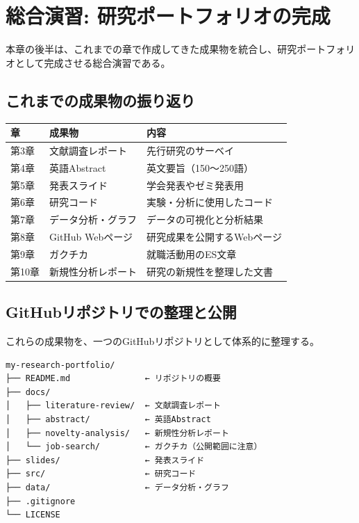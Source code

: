 \section{総合演習: 研究ポートフォリオの完成}

本章の後半は、これまでの章で作成してきた成果物を統合し、研究ポートフォリオとして完成させる総合演習である。

\subsection*{これまでの成果物の振り返り}

\begin{table}[H]
\centering
\small
\begin{tabular}{lll}
\toprule
章 & 成果物 & 内容 \\
\midrule
第3章 & 文献調査レポート & 先行研究のサーベイ \\
第4章 & 英語Abstract & 英文要旨（150〜250語） \\
第5章 & 発表スライド & 学会発表やゼミ発表用 \\
第6章 & 研究コード & 実験・分析に使用したコード \\
第7章 & データ分析・グラフ & データの可視化と分析結果 \\
第8章 & GitHub Webページ & 研究成果を公開するWebページ \\
第9章 & ガクチカ & 就職活動用のES文章 \\
第10章 & 新規性分析レポート & 研究の新規性を整理した文書 \\
\bottomrule
\end{tabular}
\end{table}

\subsection*{GitHubリポジトリでの整理と公開}

これらの成果物を、一つのGitHubリポジトリとして体系的に整理する。

\begin{verbatim}
my-research-portfolio/
├── README.md               ← リポジトリの概要
├── docs/
│   ├── literature-review/  ← 文献調査レポート
│   ├── abstract/           ← 英語Abstract
│   ├── novelty-analysis/   ← 新規性分析レポート
│   └── job-search/         ← ガクチカ（公開範囲に注意）
├── slides/                 ← 発表スライド
├── src/                    ← 研究コード
├── data/                   ← データ分析・グラフ
├── .gitignore
└── LICENSE
\end{verbatim}

